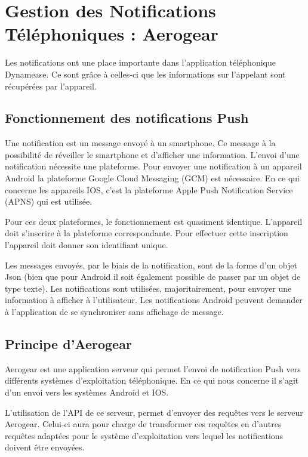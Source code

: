 \section{Gestion des Notifications Téléphoniques : Aerogear}

Les notifications ont une place importante dans l'application téléphonique Dynamease. Ce sont grâce à celles-ci que les informations sur l'appelant sont récupérées par l'appareil. 

\subsection{Fonctionnement des notifications Push}

Une notification est un message envoyé à un smartphone. Ce message à la possibilité de réveiller le smartphone et d'afficher une information. L'envoi d'une notification nécessite une plateforme. Pour envoyer une notification à un appareil Android la plateforme Google Cloud Messaging (GCM) est nécessaire. En ce qui concerne les appareils IOS, c'est la plateforme Apple Push Notification Service (APNS) qui est utilisée.

Pour ces deux plateformes, le fonctionnement est quasiment identique. L'appareil doit s'inscrire à la plateforme correspondante. Pour effectuer cette inscription l'appareil doit donner son identifiant unique.

Les messages envoyés, par le biais de la notification, sont de la forme d'un objet Json (bien que pour Android il soit également possible de passer par un objet de type texte). Les notifications sont utilisées, majoritairement, pour envoyer une information à afficher à l'utilisateur. Les notifications Android peuvent demander à l'application de se synchroniser sans affichage de message.

\subsection{Principe d'Aerogear}

Aerogear est une application serveur qui permet l'envoi de notification Push vers différents systèmes d'exploitation téléphonique. En ce qui nous concerne il s'agit d'un envoi vers les systèmes Android et IOS.

L'utilisation de l'API de ce serveur, permet d'envoyer des requêtes vers le serveur Aerogear. Celui-ci aura pour charge de transformer ces requêtes en d'autres requêtes adaptées pour le système d'exploitation vers lequel les notifications doivent être envoyées.

